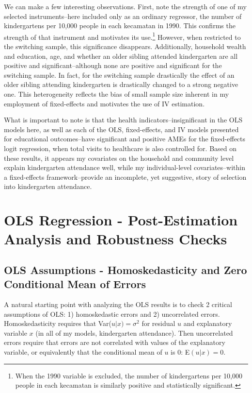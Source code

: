 We can make a few interesting observations. First, note the strength of one of my selected instruments--here included only as an ordinary regressor, the number of kindergartens per 10,000 people in each kecamatan in 1990. This confirms the strength of that instrument and motivates its use.\footnote{ When the 1990 variable is excluded, the number of kindergartens per 10,000 people in each kecamatan is similarly positive and statistically significant.} However, when restricted to the switching sample, this significance disappears. Additionally, household wealth and education, age, and whether an older sibling attended kindergarten are all positive and significant--although none are positive and significant for the switching sample. In fact, for the switching sample drastically the effect of an older sibling attending kindergarten is drastically changed to a strong negative one. This heterogeneity reflects the bias of small sample size inherent in my employment of fixed-effects and motivates the use of IV estimation. 

What is important to note is that the health indicators--insignificant in the OLS models here, as well as each of the OLS, fixed-effects, and IV models presented for educational outcomes--have significant and positive AMEs for the fixed-effects logit regression, when total visits to healthcare is also controlled for. Based on these results, it appears my covariates on the household and community level explain kindergarten attendance well, while my individual-level covariates--within a fixed-effects framework--provide an incomplete, yet suggestive, story of selection into kindergarten attendance.

\section{OLS Regression - Post-Estimation Analysis and Robustness Checks}
	\label{app:ols_post}
	\subsection{OLS Assumptions - Homoskedasticity and Zero Conditional Mean of Errors}
A natural starting point with analyzing the OLS results is to check 2 critical assumptions of OLS: 1) homoskedastic errors and 2) uncorrelated errors. Homoskedasticity requires that Var($u | x) = \sigma ^ 2$ for residual $u$ and explanatory variable $x$ (in all of my models, kindergarten attendance). Then uncorrelated errors require that errors are not correlated with values of the explanatory variable, or equivalently that the conditional mean of $u$ is 0: E$(u | x) = 0$. 

